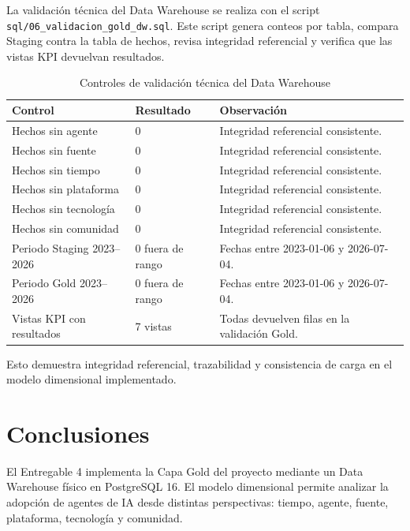 \documentclass[12pt,a4paper]{article}
\newcommand{\pathcode}[1]{\begingroup\scriptsize\ttfamily\nolinkurl{#1}\endgroup}
\begin{document}
La validaci\'on t\'ecnica del Data Warehouse se realiza con el script \pathcode{sql/06_validacion_gold_dw.sql}. Este script genera conteos por tabla, compara Staging contra la tabla de hechos, revisa integridad referencial y verifica que las vistas KPI devuelvan resultados.

\begin{table}[H]
\centering
\footnotesize
{}
\begin{tabular}{|P{5cm}|P{3cm}|P{5.8cm}|}
\hline
{}
\textbf{Control} & \textbf{Resultado} & \textbf{Observaci\'on} \\ \hline
Hechos sin agente & 0 & Integridad referencial consistente. \\ \hline
Hechos sin fuente & 0 & Integridad referencial consistente. \\ \hline
Hechos sin tiempo & 0 & Integridad referencial consistente. \\ \hline
Hechos sin plataforma & 0 & Integridad referencial consistente. \\ \hline
Hechos sin tecnolog\'ia & 0 & Integridad referencial consistente. \\ \hline
Hechos sin comunidad & 0 & Integridad referencial consistente. \\ \hline
Periodo Staging 2023--2026 & 0 fuera de rango & Fechas entre 2023-01-06 y 2026-07-04. \\ \hline
Periodo Gold 2023--2026 & 0 fuera de rango & Fechas entre 2023-01-06 y 2026-07-04. \\ \hline
Vistas KPI con resultados & 7 vistas & Todas devuelven filas en la validaci\'on Gold. \\ \hline
\end{tabular}
\caption{Controles de validaci\'on t\'ecnica del Data Warehouse}
\end{table}

Esto demuestra integridad referencial, trazabilidad y consistencia de carga en el modelo dimensional implementado.

\section{Conclusiones}

El Entregable 4 implementa la Capa Gold del proyecto mediante un Data Warehouse f\'isico en PostgreSQL 16. El modelo dimensional permite analizar la adopci\'on de agentes de IA desde distintas perspectivas: tiempo, agente, fuente, plataforma, tecnolog\'ia y comunidad.
\end{document}
